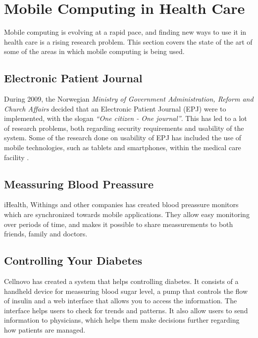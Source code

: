 \section{Mobile Computing in Health Care}
Mobile computing is evolving at a rapid pace, and finding new ways to use it in health care is a rising research problem. This section covers the state of the art of some of the areas in which mobile computing is being used.  

\subsection{Electronic Patient Journal}
During 2009, the Norwegian \emph{Ministry of Government Administration, Reform and Church Affairs} decided that an Electronic Patient Journal (EPJ) were to implemented, with the slogan \emph{``One citizen - One journal''}\cite{epjregjering}. This has led to a lot of research problems, both regarding security requirements and usability of the system. Some of the research done on usability of EPJ has included the use of mobile technologies, such as tablets and smartphones, within the medical care facility \cite{svanaes2010usability}.    

\subsection{Meassuring Blood Preassure}
iHealth, Withings and other companies has created blood preassure monitors which are synchronized towards mobile applications. They allow easy monitoring over periods of time, and makes it possible to share meassurements to both friends, family and doctors.


\subsection{Controlling Your Diabetes}
Cellnovo has created a system that helps controlling diabetes. It consists of a handheld device for meassuring blood sugar level, a pump that controls the flow of insulin and a web interface that allows you to access the information. The interface helps users to check for trends and patterns. It also allow users to send information to physicians, which helps them make decisions further regarding how patients are managed.
   
